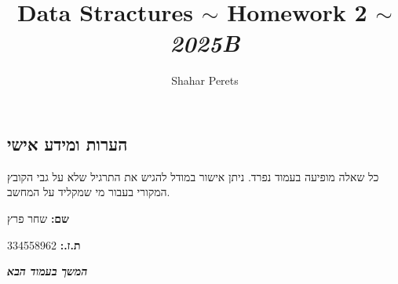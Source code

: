 \documentclass[]{article}
\author{Shahar Perets}
\title{Data Stractures $\sim$ Homework 2 $\sim$ \textit{2025B}}
\newcommand\sen   {\begin{otherlanguage}{english}}
\newcommand\she   {\end{otherlanguage}}
\newcommand\npage {\vfil {\hfil \textbf{\textit{המשך בעמוד הבא}}} \hfil \vfil \pagebreak}
\theoremstyle{definition}
\begin{document}
	\sen\maketitle\she
	\subsection*{הערות ומידע אישי}
	כל שאלה מופיעה בעמוד נפרד. ניתן אישור במודל להגיש את התרגיל שלא על גבי הקובץ המקורי בעבור מי שמקליד על המחשב. 
	
	\textbf{שם: }שחר פרץ
	
	\textbf{ת.ז.: }334558962
	
	\npage
	
	\section{}
\end{document}
